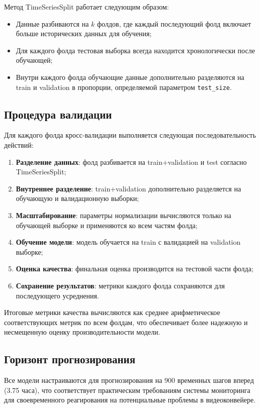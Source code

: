 \hspace*{1.25cm}Метод TimeSeriesSplit работает следующим образом:
\begin{itemize}
	\item Данные разбиваются на $k$ фолдов, где каждый последующий фолд включает больше исторических данных для обучения;
	\item Для каждого фолда тестовая выборка всегда находится хронологически после обучающей;
	\item Внутри каждого фолда обучающие данные дополнительно разделяются на train и validation в пропорции, определяемой параметром \texttt{test\_size}.
\end{itemize}

\subsection{Процедура валидации}

\hspace*{1.25cm}Для каждого фолда кросс-валидации выполняется следующая последовательность действий:
\begin{enumerate}
	\item \textbf{Разделение данных}: фолд разбивается на train+validation и test согласно TimeSeriesSplit;
	\item \textbf{Внутреннее разделение}: train+validation дополнительно разделяется на обучающую и валидационную выборки;
	\item \textbf{Масштабирование}: параметры нормализации вычисляются только на обучающей выборке и применяются ко всем частям фолда;
	\item \textbf{Обучение модели}: модель обучается на train с валидацией на validation выборке;
	\item \textbf{Оценка качества}: финальная оценка производится на тестовой части фолда;
	\item \textbf{Сохранение результатов}: метрики каждого фолда сохраняются для последующего усреднения.
\end{enumerate}

\hspace*{1.25cm}Итоговые метрики качества вычисляются как среднее арифметическое соответствующих метрик по всем фолдам, что обеспечивает более надежную и несмещенную оценку производительности модели.

\subsection{Горизонт прогнозирования}

\hspace*{1.25cm}Все модели настраиваются для прогнозирования на 900 временных шагов вперед (3.75 часа), что соответствует практическим требованиям системы мониторинга для своевременного реагирования на потенциальные проблемы в видеоконвейере.

